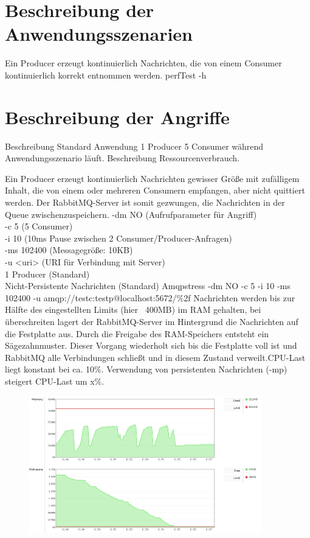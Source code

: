 \documentclass[	a4paper,
			11pt,
			titlepage,
			oneside,
			fleqn,
			listof=totoc,
			parskip,
			chapterprefix=false,
			numbers=noenddot]{scrreprt}
\begin{document}
	
\clearpage
\section*{Beschreibung der Anwendungsszenarien}

		{Ein Producer erzeugt kontinuierlich Nachrichten, die von einem Consumer kontinuierlich korrekt entnommen werden.}%
		{perfTest -h}%
		{}


	
\clearpage
\section*{Beschreibung der Angriffe}

	Beschreibung Standard Anwendung 1 Producer 5 Consumer während Anwendungsszenario läuft. Beschreibung Ressourcenverbrauch.

\clearpage
		{Ein Producer erzeugt kontinuierlich Nachrichten gewisser Größe mit zufälligem Inhalt, die von einem oder mehreren Consumern empfangen, aber nicht quittiert werden.%
		 Der RabbitMQ-Server ist somit gezwungen, die Nachrichten in der Queue zwischenzuspeichern.}%
		{%
		 -dm NO (Aufrufparameter für Angriff) \\
		 -c 5 (5 Consumer) \\
		 -i 10 (10ms Pause zwischen 2 Consumer/Producer-Anfragen) \\
		 -ms 102400 (Messagegröße: 10KB) \\
		 -u <uri> (URI für Verbindung mit Server) \\
		 1 Producer (Standard) \\
		 Nicht-Persistente Nachrichten (Standard)
		}%
		{Amqpstress -dm NO -c 5 -i 10 -ms 102400 -u amqp://testc:testp@localhost:5672/\%2f}%
		{Nachrichten werden bis zur Hälfte des eingestellten Limits (hier ~400MB) im RAM gehalten, bei überschreiten lagert der RabbitMQ-Server im Hintergrund die Nachrichten auf die Festplatte aus. Durch die Freigabe des RAM-Speichers entsteht ein Sägezahnmuster. Dieser Vorgang wiederholt sich bis die Festplatte voll ist und RabbitMQ alle Verbindungen schließt und in diesem Zustand verweilt.CPU-Last liegt konstant bei ca. 10\%.}%
		{Verwendung von persistenten Nachrichten (-mp) steigert CPU-Last um x\%.}
		
		\begin{figure}[!htb]
			\centering
			\includegraphics[width=0.9\textwidth]{img/noResp/history_RAM_HDD.png}
		\end{figure}
	
\end{document}
